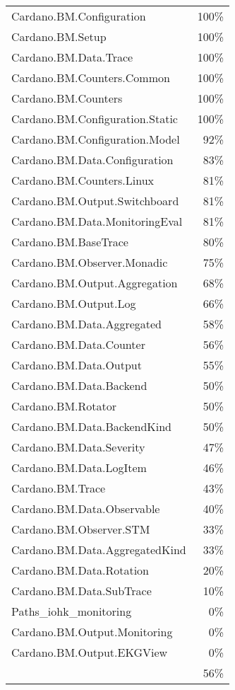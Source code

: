 \begin{tabular}{l r}
   Cardano.BM.Configuration & 100\% \\
   Cardano.BM.Setup & 100\% \\
   Cardano.BM.Data.Trace & 100\% \\
   Cardano.BM.Counters.Common & 100\% \\
   Cardano.BM.Counters & 100\% \\
   Cardano.BM.Configuration.Static & 100\% \\
   Cardano.BM.Configuration.Model & 92\% \\
   Cardano.BM.Data.Configuration & 83\% \\
   Cardano.BM.Counters.Linux & 81\% \\
   Cardano.BM.Output.Switchboard & 81\% \\
   Cardano.BM.Data.MonitoringEval & 81\% \\
   Cardano.BM.BaseTrace & 80\% \\
   Cardano.BM.Observer.Monadic & 75\% \\
   Cardano.BM.Output.Aggregation & 68\% \\
   Cardano.BM.Output.Log & 66\% \\
   Cardano.BM.Data.Aggregated & 58\% \\
   Cardano.BM.Data.Counter & 56\% \\
   Cardano.BM.Data.Output & 55\% \\
   Cardano.BM.Data.Backend & 50\% \\
   Cardano.BM.Rotator & 50\% \\
   Cardano.BM.Data.BackendKind & 50\% \\
   Cardano.BM.Data.Severity & 47\% \\
   Cardano.BM.Data.LogItem & 46\% \\
   Cardano.BM.Trace & 43\% \\
   Cardano.BM.Data.Observable & 40\% \\
   Cardano.BM.Observer.STM & 33\% \\
   Cardano.BM.Data.AggregatedKind & 33\% \\
   Cardano.BM.Data.Rotation & 20\% \\
   Cardano.BM.Data.SubTrace & 10\% \\
   Paths\_iohk\_monitoring & 0\% \\
   Cardano.BM.Output.Monitoring & 0\% \\
   Cardano.BM.Output.EKGView & 0\% \\
    & 56\% \\
\end{tabular}
